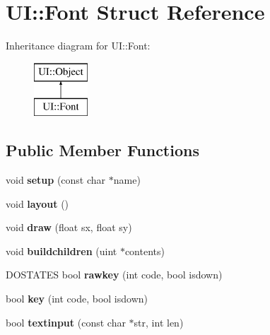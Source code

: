 \hypertarget{struct_u_i_1_1_font}{}\section{UI\+:\+:Font Struct Reference}
\label{struct_u_i_1_1_font}
Inheritance diagram for UI\+:\+:Font\+:\begin{figure}[H]
\begin{center}
\leavevmode
\includegraphics[height=2.000000cm]{struct_u_i_1_1_font}
\end{center}
\end{figure}
\subsection*{Public Member Functions}
\begin{DoxyCompactItemize}
\item 
\mbox{\label{struct_u_i_1_1_font_ad6b9e2f97ac4312331ee845f49f1ba53}} 
void {\bfseries setup} (const char $\ast$name)
\item 
\mbox{\label{struct_u_i_1_1_font_ad838ccf603bf00782d78f1705041c494}} 
void {\bfseries layout} ()
\item 
\mbox{\label{struct_u_i_1_1_font_abce1c14d18d6273df557586e87ca01c4}} 
void {\bfseries draw} (float sx, float sy)
\item 
\mbox{\label{struct_u_i_1_1_font_a6dbdd42df4dd7178e7655401db026454}} 
void {\bfseries buildchildren} (uint $\ast$contents)
\item 
\mbox{\label{struct_u_i_1_1_font_a4922bd8494ec4a005d9accc3e7f8ccbb}} 
D\+O\+S\+T\+A\+T\+ES bool {\bfseries rawkey} (int code, bool isdown)
\item 
\mbox{\label{struct_u_i_1_1_font_a8187702e45f52717d6fc339280593e97}} 
bool {\bfseries key} (int code, bool isdown)
\item 
\mbox{\label{struct_u_i_1_1_font_ac4803a16fdd7a3d34b39fde36d7122af}} 
bool {\bfseries textinput} (const char $\ast$str, int len)
\end{DoxyCompactItemize}
